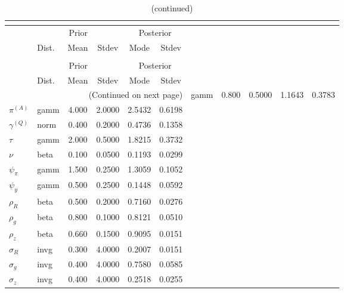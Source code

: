  
\begin{center}
\begin{longtable}{llcccc} 
\caption{Results from posterior maximization (parameters)}\\
 \label{Table:Posterior:1}\\
\toprule 
  & \multicolumn{3}{c}{Prior}  &  \multicolumn{2}{c}{Posterior} \\
  \cmidrule(r{.75em}){2-4} \cmidrule(r{.75em}){5-6}
  & Dist. & Mean  & Stdev & Mode & Stdev \\ 
\midrule \endfirsthead 
\caption{(continued)}\\
 \bottomrule 
  & \multicolumn{3}{c}{Prior}  &  \multicolumn{2}{c}{Posterior} \\
  \cmidrule(r{.75em}){2-4} \cmidrule(r{.75em}){5-6}
  & Dist. & Mean  & Stdev & Mode & Stdev \\ 
\midrule \endhead 
\bottomrule \multicolumn{6}{r}{(Continued on next page)}\endfoot 
\bottomrule\endlastfoot 
${r_{A}}$ & gamm &   0.800 & 0.5000 &   1.1643 &  0.3783 \\ 
${\pi^{(A)}}$ & gamm &   4.000 & 2.0000 &   2.5432 &  0.6198 \\ 
${\gamma^{(Q)}}$ & norm &   0.400 & 0.2000 &   0.4736 &  0.1358 \\ 
${\tau}$ & gamm &   2.000 & 0.5000 &   1.8215 &  0.3732 \\ 
${\nu}$ & beta &   0.100 & 0.0500 &   0.1193 &  0.0299 \\ 
${\psi_\pi}$ & gamm &   1.500 & 0.2500 &   1.3059 &  0.1052 \\ 
${\psi_y}$ & gamm &   0.500 & 0.2500 &   0.1448 &  0.0592 \\ 
${\rho_R}$ & beta &   0.500 & 0.2000 &   0.7160 &  0.0276 \\ 
${\rho_{g}}$ & beta &   0.800 & 0.1000 &   0.8121 &  0.0510 \\ 
${\rho_z}$ & beta &   0.660 & 0.1500 &   0.9095 &  0.0151 \\ 
${\sigma_R}$ & invg &   0.300 & 4.0000 &   0.2007 &  0.0151 \\ 
${\sigma_{g}}$ & invg &   0.400 & 4.0000 &   0.7580 &  0.0585 \\ 
${\sigma_z}$ & invg &   0.400 & 4.0000 &   0.2518 &  0.0255 \\ 
\end{longtable}
 \end{center}
